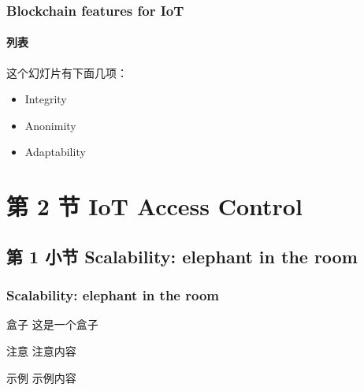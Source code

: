 \documentclass[
    aspectratio=169,                   %
]{beamer}
\begin{document}
    \begin{frame}
        \frametitle{Blockchain features for IoT}

        \paragraph{列表} 这个\alert{幻灯片}有下面几项：

        \begin{itemize}
            \item Integrity
            \item Anonimity
            \item Adaptability
        \end{itemize}

    \end{frame}


        

\section{第 2 节 IoT Access Control}

\subsection{第 1 小节 Scalability: elephant in the room}

    \begin{frame}
        \frametitle{Scalability: elephant in the room}
        
        \begin{block}{盒子}
            这是一个盒子\cite{conoscenti}
        \end{block}

        \begin{alertblock}{注意}
            注意内容
        \end{alertblock}

        \begin{exampleblock}{示例}
            示例内容
        \end{exampleblock}
    \end{frame}
\end{document}
